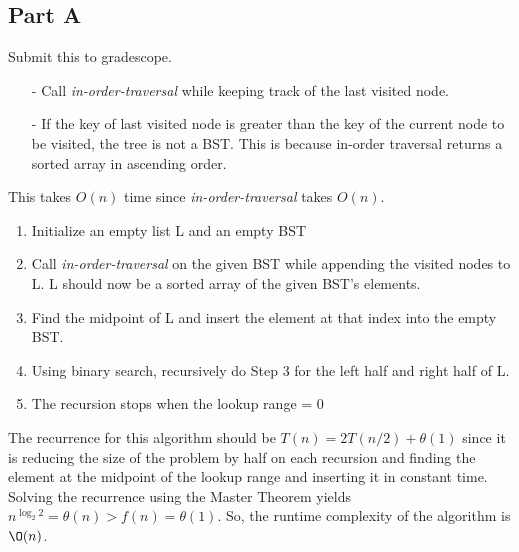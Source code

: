 \documentclass[12pt,twoside]{article}
\begin{document}

\begin{problems}

\section*{Part A}

\problem  %
Submit this to gradescope.

\begin{problemparts}
\problempart 
\begin{itemize}
	\item[- ] Call  \textit{in-order-traversal} while keeping track of the last visited node.
	\item[- ] If the key of last visited node is greater than the key of the current node to be visited, the tree is not a BST. This is because in-order traversal returns a sorted array in ascending order.
\end{itemize}

This takes $O(n)$ time since \textit{in-order-traversal} takes $O(n)$.
 
\problempart

\begin{enumerate}
	\item Initialize an empty list L and an empty BST
	\item Call \textit{in-order-traversal} on the given BST while appending the visited nodes to L. L should now be a sorted array of the given BST's elements.  
	\item Find the midpoint of L and insert the element at that index into the empty BST.
	\item Using binary search, recursively do Step 3 for the left half and right half of L. 
	\item The recursion stops when the lookup range = 0\\
	
\end{enumerate}

The recurrence for this algorithm should be $ T(n) = 2T(n/2) + \theta (1)$ since it is reducing the size of the problem by half on each recursion and finding the element at the midpoint of the lookup range and inserting it in constant time. Solving the recurrence using the Master Theorem yields $n^{\log_{2}2}= \theta(n) >  f(n) = \theta(1) $. So, the runtime complexity of the algorithm is  $ \O(n) $.


\end{problemparts}
\end{problems}
\end{document}
